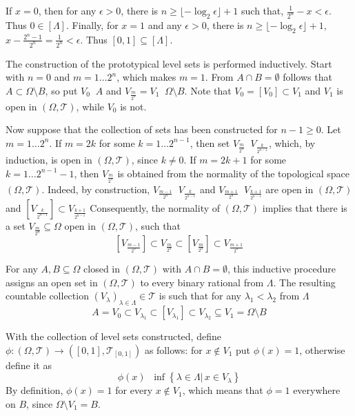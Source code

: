 \documentclass[a4paper]{article}
\newcommand{\obj}[1]{\left\{ #1 \right \}}
\newcommand{\clo}[1]{\left [ #1 \right ]}
\newcommand{\brac}[1]{\left ( #1 \right )}
\newcommand{\induc}[1]{\left . #1 \right \vert}
\newcommand{\Tcal}{\mathcal{T}}
\newcommand{\defn}{\mathop{\overset{\Delta}{=}}\nolimits}
\begin{document}
If $x = 0$, then for any $\epsilon > 0$, there is $n \geq \lfloor -\log_2 \epsilon \rfloor + 1$ such that, $\frac{1}{2^n} - x < \epsilon$. Thus $0\in \clo{\Lambda}$. Finally, for $x=1$ and any $\epsilon > 0$, there is $n \geq \lfloor -\log_2 \epsilon \rfloor + 1$, $x - \frac{2^n-1}{2^n} = \frac{1}{2^n} < \epsilon$. Thus $\clo{0,1} \subseteq \clo{\Lambda}$.

The construction of the prototypical level sets is performed inductively. 
Start with $n=0$ and $m=1\ldots 2^n$, which makes $m=1$. From $A\cap B = \emptyset$ follows that $A\subset \Omega \setminus B$, so put $V_0 \defn A$ and $V_{\frac{m}{2^n}} = V_1 \defn \Omega \setminus B$. Note that $V_0 = \clo{V_0}\subset V_1$ and $V_1$ is open in $\brac{\Omega, \Tcal}$, while $V_0$ is not.

Now suppose that the collection of sets has been constructed for $n-1 \geq 0$. Let $m = 1\ldots 2^n$. If $m=2k$ for some $k=1\ldots 2^{n-1}$, then set $V_{\frac{m}{2^n}}\defn V_{\frac{k}{2^{n-1}}}$, which, by induction, is open in $\brac{\Omega, \Tcal}$, since $k\neq 0$. If $m=2k+1$ for some $k=1\ldots 2^{n-1}-1$, then $V_{\frac{m}{2^n}}$ is obtained from the normality of the topological space $\brac{\Omega, \Tcal}$. Indeed, by construction, $V_{\frac{m-1}{2^n}} \defn V_{\frac{k}{2^{n-1}}}$ and $V_{\frac{m+1}{2^n}} \defn V_{\frac{k+1}{2^{n-1}}}$ are open in $\brac{\Omega, \Tcal}$ and $\clo{V_{\frac{k}{2^{n-1}}}} \subset V_{\frac{k+1}{2^{n-1}}}$ Consequently, the normality of $\brac{\Omega, \Tcal}$ implies that there is a set $V_{\frac{m}{2^n}}\subseteq \Omega$ open in $\brac{\Omega, \Tcal}$, such that \[\clo{V_{\frac{m-1}{2^n}}} \subset V_{\frac{m}{2^n}} \subset \clo{V_{\frac{m}{2^n}}} \subset V_{\frac{m+1}{2^n}}\]

For any $A,B\subseteq \Omega$ closed in $\brac{\Omega, \Tcal}$ with $A\cap B = \emptyset$, this inductive procedure assigns an open set in $\brac{\Omega, \Tcal}$ to every binary rational from $\Lambda$. The resulting countable collection $\brac{V_\lambda}_{\lambda\in \Lambda} \in \Tcal$ is such that for any $\lambda_1 < \lambda_2$ from $\Lambda$ \[A = V_0 \subset V_{\lambda_1} \subset \clo{V_{\lambda_1}} \subset V_{\lambda_2} \subseteq V_1 = \Omega \setminus B\]

With the collection of level sets constructed, define $\phi:\brac{\Omega,\Tcal}\to \brac{\clo{0,1},\Tcal_{\clo{0,1}}}$ as follows: for $x\notin V_1$ put $\phi(x) = 1$, otherwise define it as \[\phi\brac{x} \defn \inf \obj{\induc{\lambda \in \Lambda}\, x\in V_\lambda}\] By definition, $\phi(x) = 1$ for every $x\notin V_1$, which means that $\phi = 1$ everywhere on $B$, since $\Omega \setminus V_1 = B$.
\end{document}
